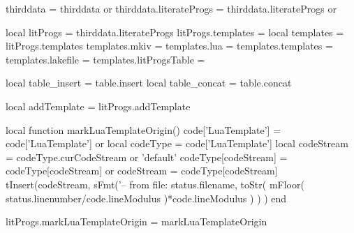 thirddata               = thirddata               or {}
thirddata.literateProgs = thirddata.literateProgs or {}

local litProgs          = thirddata.literateProgs
litProgs.templates      = {}
local templates         = litProgs.templates
templates.mkiv          = {}
templates.lua           = {}
templates.templates     = {}
templates.lakefile      = {}
templates.litProgsTable = {}

local table_insert = table.insert
local table_concat = table.concat

local addTemplate = litProgs.addTemplate
\stopLuaTemplate

\startLuaCode
local function markLuaTemplateOrigin()
  code['LuaTemplate']  = code['LuaTemplate'] or { }
  local codeType       = code['LuaTemplate']
  local codeStream     = codeType.curCodeStream or 'default'
  codeType[codeStream] = codeType[codeStream] or { }
  codeStream           = codeType[codeStream]
  tInsert(codeStream,
    sFmt('-- from file: %
      status.filename,
      toStr(
        mFloor(
          status.linenumber/code.lineModulus
        )*code.lineModulus
      )
    )
  )
end

litProgs.markLuaTemplateOrigin = markLuaTemplateOrigin
\stopLuaCode

\setLitProgsOriginMarker[LuaTemplate][markLuaTemplateOrigin]


\stopchapter
